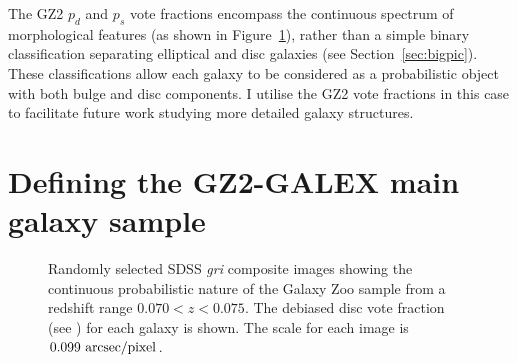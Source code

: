 The GZ2 $p_d$ and $p_s$ vote fractions encompass the continuous spectrum of morphological features (as shown in Figure~\ref{fig:mosaic}), rather than a simple binary classification separating elliptical and disc galaxies (see Section~\ref{sec:bigpic}). These classifications allow each galaxy to be considered as a probabilistic object with both bulge and disc components. I utilise the GZ2 vote fractions in this case to facilitate future work studying more detailed galaxy structures. 

\section{Defining the GZ2-GALEX main galaxy sample}\label{sec:defsample}

\begin{figure}
\caption[Example SDSS images with GZ2 vote fractions]{Randomly selected SDSS \emph{gri} composite images showing the continuous probabilistic nature of the Galaxy Zoo sample from a redshift range $0.070 < z < 0.075$. The debiased disc vote fraction (see \citealt{GZ2}) for each galaxy is shown. The scale for each image is $0.099~\rm{arcsec/pixel}$.}
\label{fig:mosaic}
\end{figure}

